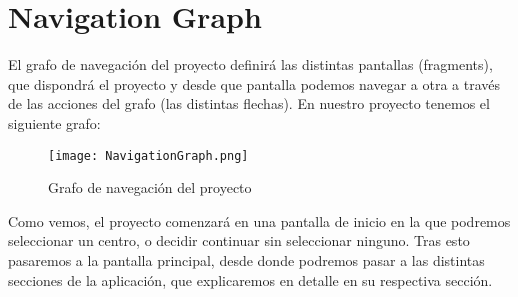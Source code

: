 \section{Navigation Graph}

El grafo de navegación del proyecto definirá las distintas pantallas (fragments), que dispondrá el proyecto y desde que pantalla podemos navegar a otra a través de las acciones del grafo (las distintas flechas). En nuestro proyecto tenemos el siguiente grafo:


\begin{figure}[H]
	\centering
	\texttt{[image: NavigationGraph.png]}
	\caption{Grafo de navegación del proyecto}
\end{figure}


Como vemos, el proyecto comenzará en una pantalla de inicio en la que podremos seleccionar un centro, o decidir continuar sin seleccionar ninguno. Tras esto pasaremos a la pantalla principal, desde donde podremos pasar a las distintas secciones de la aplicación, que explicaremos en detalle en su respectiva sección.


